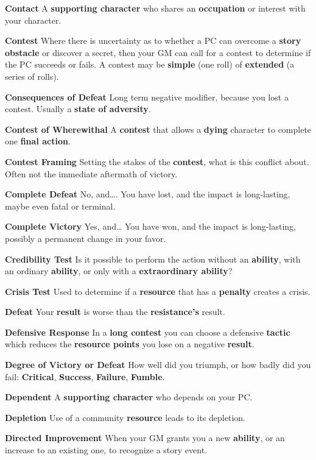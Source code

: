 \documentclass[
]{article}
\begin{document}
\textbf{Contact} A \textbf{supporting character} who shares an
\textbf{occupation} or interest with your character.

\textbf{Contest} Where there is uncertainty as to whether a PC can
overcome a \textbf{story obstacle} or discover a secret, then your GM
can call for a contest to determine if the PC succeeds or fails. A
contest may be \textbf{simple} (one roll) of \textbf{extended} (a series
of rolls).

\textbf{Consequences of Defeat} Long term negative modifier, because you
lost a contest. Usually a \textbf{state of adversity}.

\textbf{Contest of Wherewithal} A \textbf{contest} that allows a
\textbf{dying} character to complete one \textbf{final action}.

\textbf{Contest Framing} Setting the stakes of the \textbf{contest},
what is this conflict about. Often not the immediate aftermath of
victory.

\textbf{Complete Defeat} No, and\ldots. You have lost, and the impact is
long-lasting, maybe even fatal or terminal.

\textbf{Complete Victory} Yes, and\ldots{} You have won, and the impact
is long-lasting, possibly a permanent change in your favor.

\textbf{Credibility Test} Is it possible to perform the action without
an \textbf{ability}, with an ordinary \textbf{ability}, or only with a
\textbf{extraordinary ability}?

\textbf{Crisis Test} Used to determine if a \textbf{resource} that has a
\textbf{penalty} creates a crisis.

\textbf{Defeat} Your \textbf{result} is worse than the
\textbf{resistance's} result.

\textbf{Defensive Response} In a \textbf{long contest} you can choose a
defensive \textbf{tactic} which reduces the \textbf{resource points} you
lose on a negative \textbf{result}.

\textbf{Degree of Victory or Defeat} How well did you triumph, or how
badly did you fail: \textbf{Critical}, \textbf{Success},
\textbf{Failure}, \textbf{Fumble}.

\textbf{Dependent} A \textbf{supporting character} who depends on your
PC.

\textbf{Depletion} Use of a community \textbf{resource} leads to its
depletion.

\textbf{Directed Improvement} When your GM grants you a new
\textbf{ability}, or an increase to an existing one, to recognize a
story event.
\end{document}
